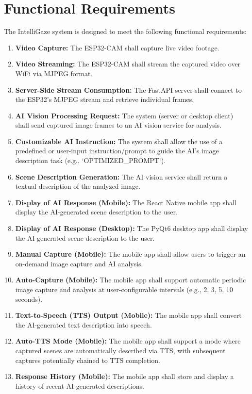 \documentclass[12pt, a4paper]{report}
\begin{document}
\section{Functional Requirements}
The IntelliGaze system is designed to meet the following functional requirements:
\begin{enumerate}[label=FR\arabic*:]
    \item \textbf{Video Capture:} The ESP32-CAM shall capture live video footage.
    \item \textbf{Video Streaming:} The ESP32-CAM shall stream the captured video over WiFi via MJPEG format.
    \item \textbf{Server-Side Stream Consumption:} The FastAPI server shall connect to the ESP32's MJPEG stream and retrieve individual frames.
    \item \textbf{AI Vision Processing Request:} The system (server or desktop client) shall send captured image frames to an AI vision service for analysis.
    \item \textbf{Customizable AI Instruction:} The system shall allow the use of a predefined or user-input instruction/prompt to guide the AI's image description task (e.g., `OPTIMIZED\_PROMPT`).
    \item \textbf{Scene Description Generation:} The AI vision service shall return a textual description of the analyzed image.
    \item \textbf{Display of AI Response (Mobile):} The React Native mobile app shall display the AI-generated scene description to the user.
    \item \textbf{Display of AI Response (Desktop):} The PyQt6 desktop app shall display the AI-generated scene description to the user.
    \item \textbf{Manual Capture (Mobile):} The mobile app shall allow users to trigger an on-demand image capture and AI analysis.
    \item \textbf{Auto-Capture (Mobile):} The mobile app shall support automatic periodic image capture and analysis at user-configurable intervals (e.g., 2, 3, 5, 10 seconds).
    \item \textbf{Text-to-Speech (TTS) Output (Mobile):} The mobile app shall convert the AI-generated text description into speech.
    \item \textbf{Auto-TTS Mode (Mobile):} The mobile app shall support a mode where captured scenes are automatically described via TTS, with subsequent captures potentially chained to TTS completion.
    \item \textbf{Response History (Mobile):} The mobile app shall store and display a history of recent AI-generated descriptions.

\end{enumerate}
\end{document}
